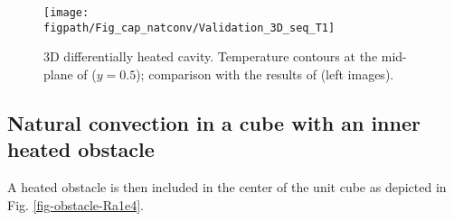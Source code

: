 \begin{figure}[!ht]
\begin{minipage}{\linewidth}
\begin{center}
 {\texttt{[image: \\figpath/Fig\_cap\_natconv/Validation\_3D\_seq\_T1]}}
\end{center}
\end{minipage}
\caption{3D differentially heated cavity. Temperature contours at the mid-plane of ($y=0.5$); comparison with the results of \cite{Wakashima-2004} (left images). }
\label{fig-3DT} 
\end{figure}

\subsection{Natural convection in a cube with an inner heated obstacle}\label{sub-OBSTACLE-3D}
A heated obstacle is then included in the center of the unit cube as depicted in Fig. \ref{fig-obstacle-Ra1e4}.


